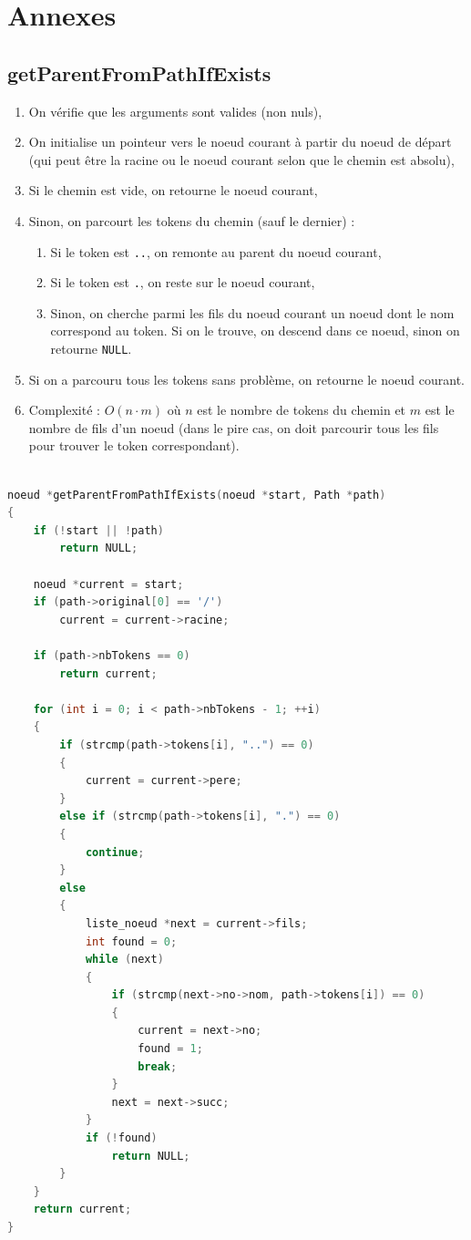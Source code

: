 \documentclass{article}
\begin{document}
\newpage
\section{Annexes}
\subsection{getParentFromPathIfExists}
\begin{enumerate}
    \item On vérifie que les arguments sont valides (non nuls),
    \item On initialise un pointeur vers le noeud courant à partir du noeud de départ (qui peut être la racine ou le noeud courant selon que le chemin est absolu),
    \item Si le chemin est vide, on retourne le noeud courant,
    \item Sinon, on parcourt les tokens du chemin (sauf le dernier) :
    \begin{enumerate}
        \item Si le token est \texttt{..}, on remonte au parent du noeud courant,
        \item Si le token est \texttt{.}, on reste sur le noeud courant,
        \item Sinon, on cherche parmi les fils du noeud courant un noeud dont le nom correspond au token. Si on le trouve, on descend dans ce noeud, sinon on retourne \texttt{NULL}.
    \end{enumerate}
    \item Si on a parcouru tous les tokens sans problème, on retourne le noeud courant. 
    \item Complexité : $O(n \cdot m)$ où $n$ est le nombre de tokens du chemin et $m$ est le nombre de fils d'un noeud (dans le pire cas, on doit parcourir tous les fils pour trouver le token correspondant).
\end{enumerate}

\begin{lstlisting}[language=C]

noeud *getParentFromPathIfExists(noeud *start, Path *path)
{
    if (!start || !path)
        return NULL;

    noeud *current = start;
    if (path->original[0] == '/')
        current = current->racine;

    if (path->nbTokens == 0)
        return current;

    for (int i = 0; i < path->nbTokens - 1; ++i)
    {
        if (strcmp(path->tokens[i], "..") == 0)
        {
            current = current->pere;
        }
        else if (strcmp(path->tokens[i], ".") == 0)
        {
            continue;
        }
        else
        {
            liste_noeud *next = current->fils;
            int found = 0;
            while (next)
            {
                if (strcmp(next->no->nom, path->tokens[i]) == 0)
                {
                    current = next->no;
                    found = 1;
                    break;
                }
                next = next->succ;
            }
            if (!found)
                return NULL;
        }
    }
    return current;
}

\end{lstlisting}
\end{document}
